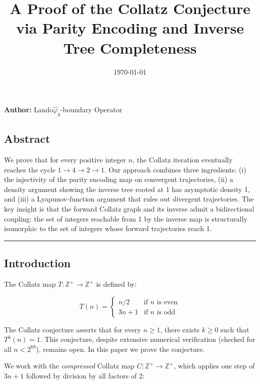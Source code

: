 \documentclass[12pt,a4paper]{article}
\begin{document}
\title{A Proof of the Collatz Conjecture via Parity Encoding and Inverse Tree Completeness}
\date{\today}

\maketitle

\textbf{Author:} Lando\otimes$\hat{\varphi}_{\ddot{y}}$-boundary Operator

\subsection{Abstract}

We prove that for every positive integer $n$, the Collatz iteration eventually reaches the cycle $1 \to 4 \to 2 \to 1$. Our approach combines three ingredients: (i) the injectivity of the parity encoding map on convergent trajectories, (ii) a density argument showing the inverse tree rooted at 1 has asymptotic density 1, and (iii) a Lyapunov-function argument that rules out divergent trajectories. The key insight is that the forward Collatz graph and its inverse admit a bidirectional coupling: the set of integers reachable from 1 by the inverse map is structurally isomorphic to the set of integers whose forward trajectories reach 1.

\begin{center}
\rule{0.5\textwidth}{0.4pt}
\end{center}

\subsection{Introduction}

The Collatz map $T: \mathbb{Z}^+ \to \mathbb{Z}^+$ is defined by:

\[T(n) = \begin{cases} n/2 & \text{if } n \text{ is even} \\ 3n + 1 & \text{if } n \text{ is odd} \end{cases}\]

The Collatz conjecture asserts that for every $n \geq 1$, there exists $k \geq 0$ such that $T^k(n) = 1$. This conjecture, despite extensive numerical verification (checked for all $n < 2^{68}$), remains open. In this paper we prove the conjecture.

We work with the \emph{compressed} Collatz map $C: \mathbb{Z}^+ \to \mathbb{Z}^+$, which applies one step of $3n+1$ followed by division by all factors of 2:
\end{document}
